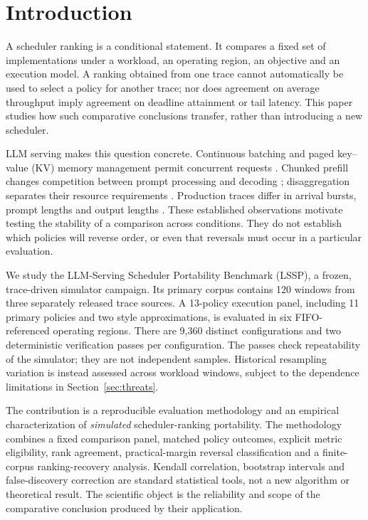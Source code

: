 \section{Introduction}\label{sec:introduction}
A scheduler ranking is a conditional statement. It compares a fixed set of
implementations under a workload, an operating region, an objective and an
execution model. A ranking obtained from one trace cannot automatically be
used to select a policy for another trace; nor does agreement on average
throughput imply agreement on deadline attainment or tail latency. This
paper studies how such comparative conclusions transfer, rather than
introducing a new scheduler.

LLM serving makes this question concrete. Continuous batching and paged
key--value (KV) memory management permit concurrent requests
\citep{kwon2023vllm,yu2022orca}. Chunked prefill changes competition between
prompt processing and decoding \citep{agrawal2024sarathi}; disaggregation
separates their resource requirements \citep{zhong2024distserve,patel2024splitwise}.
Production traces differ in arrival bursts, prompt lengths and output lengths
\citep{burstgpt2025,stojkovic2025dynamollm}. These established observations
motivate testing the stability of a comparison across conditions. They do
not establish which policies will reverse order, or even that reversals
must occur in a particular evaluation.

We study the LLM-Serving Scheduler Portability Benchmark (LSSP), a frozen,
trace-driven simulator campaign. Its primary corpus contains 120 windows
from three separately released trace sources. A 13-policy execution panel,
including 11 primary policies and two style approximations, is evaluated
in six FIFO-referenced operating regions. There are 9,360 distinct
configurations and two deterministic verification passes per configuration.
The passes check repeatability of the simulator; they are not independent
samples. Historical resampling variation is instead assessed across workload windows, subject
to the dependence limitations in Section~\ref{sec:threats}.

The contribution is a reproducible evaluation methodology and an empirical
characterization of \emph{simulated} scheduler-ranking portability. The
methodology combines a fixed comparison panel, matched policy outcomes,
explicit metric eligibility, rank agreement, practical-margin reversal
classification and a finite-corpus ranking-recovery analysis. Kendall
correlation, bootstrap intervals and false-discovery correction are
standard statistical tools, not a new algorithm or theoretical result.
The scientific object is the reliability and scope of the comparative
conclusion produced by their application.

